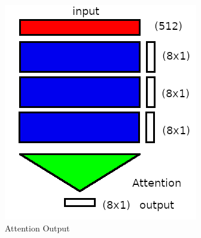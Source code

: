 \begin{figure}[H]
	\begin{center}
		
	
	\includegraphics[scale=0.5]{diagram-mat03}
\end{center}
	\caption[Attention Output]{Attention Output}
	
\end{figure}